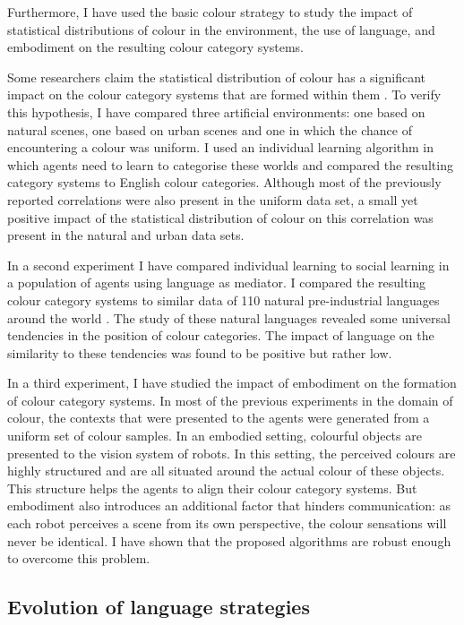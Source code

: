 Furthermore, I have used the basic colour strategy to study the
impact of statistical distributions of colour in the environment, the
use of language, and embodiment on the resulting colour category
systems.

Some researchers claim the statistical distribution of colour has a
significant impact on the colour category systems that are formed
within them \citep{yendrikhovskij01computational}. To verify this
hypothesis, I have compared three artificial environments: one based
on natural scenes, one based on urban scenes and one in which the
chance of encountering a colour was uniform. I used an individual
learning algorithm in which agents need to learn to categorise these
worlds and compared the resulting category systems to English
colour categories. Although most of the previously reported
correlations were also present in the uniform data set, a small yet
positive impact of the statistical distribution of colour on this
correlation was present in the natural and urban data sets.

In a second experiment I have compared individual learning to social
learning in a population of agents using language as mediator. I
compared the resulting colour category systems to similar data of 110
natural pre-industrial languages around the world
\citep{kay10world}. The study of these natural languages revealed
some universal tendencies in the position of colour categories. The
impact of language on the similarity to these tendencies was found to
be positive but rather low.

In a third experiment, I have studied the impact of embodiment on the
formation of colour category systems. In most of the previous
experiments in the domain of colour, the contexts that were presented
to the agents were generated from a uniform set of colour samples. In
an embodied setting, colourful objects are presented to the vision
system of robots. In this setting, the perceived colours are
highly structured and are all situated around the actual colour of
these objects. This structure helps the agents to align
their colour category systems. But embodiment also introduces an
additional factor that hinders communication: as each robot perceives
a scene from its own perspective, the colour sensations will never be
identical. I have shown that the proposed algorithms are robust enough
to overcome this problem.

\subsection{Evolution of language strategies}

